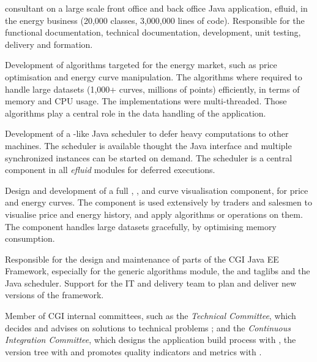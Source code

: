 \documentclass[a4paper]{article}
\begin{document}
\begin{cvexperience}%
   consultant on a large scale front office and back office
  Java application, efluid, in the energy business (20,000 classes, 3,000,000
  lines of code). Responsible for the functional documentation, technical
  documentation, development, unit testing, delivery and formation.

  \begin{cvexperiencedescription}%
    \item Development of algorithms targeted for the energy market, such as
      price optimisation and energy curve manipulation. The algorithms where
      required to handle large datasets (1,000+ curves, millions of points)
      efficiently, in terms of memory and CPU usage. The implementations were
      multi-threaded. Those algorithms play a central role in the data handling
      of the application.

    \item Development of a -like Java scheduler to defer heavy
      computations to other machines. The scheduler is available thought the
      Java  interface and multiple synchronized instances can be
      started on demand. The scheduler is a central component in all
      \emph{efluid} modules for deferred executions.

    \item Design and development of a full , ,
       and  curve visualisation component, for
      price and energy curves. The component is used extensively by traders and
      salesmen to visualise price and energy history, and apply algorithms or
      operations on them. The component handles large datasets gracefully, by
      optimising memory consumption.
    
    \item Responsible for the design and maintenance of parts of the CGI Java
      EE Framework, especially for the generic algorithms module, the
       and  taglibs and the Java scheduler.
      Support for the IT and delivery team to plan and deliver new versions of
      the framework.

    \item Member of CGI internal committees, such as the \emph{Technical
      Committee}, which decides and advises on solutions to technical problems
      ; and the \emph{Continuous Integration Committee}, which designs the
      application build process with , the version tree with
       and promotes quality indicators and metrics with
      .


\end{cvexperiencedescription}
\end{cvexperience}
\end{document}
